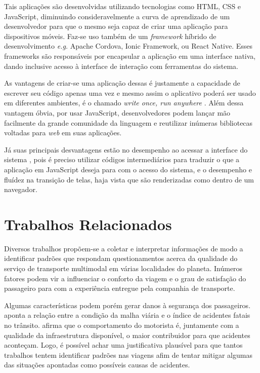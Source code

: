 \documentclass[12pt]{report} %
\begin{document}
Tais aplicações são desenvolvidas utilizando tecnologias como HTML, CSS e JavaScript, diminuindo consideravelmente a curva de aprendizado de um desenvolvedor para que o mesmo seja capaz de criar uma aplicação para dispositivos móveis. Faz-se uso também de um \textit{framework} híbrido de desenvolvimento \textit{e.g.} Apache Cordova, Ionic Framework, ou React Native. Esses frameworks são responsáveis por encapsular a aplicação em uma interface nativa, dando inclusive acesso à interface de interação com ferramentas do sistema.

As vantagens de criar-se uma aplicação dessas é justamente a capacidade de escrever seu código apenas uma vez e mesmo assim o aplicativo poderá ser usado em diferentes ambientes, é o chamado \textit{write once, run anywhere} \cite{Xanthopoulos:2013:CAC:2490257.2490292}. Além dessa vantagem óbvia, por usar JavaScript, desenvolvedores podem lançar mão facilmente da grande comunidade da linguagem e reutilizar inúmeras bibliotecas voltadas para \textit{web} em suas aplicações.

Já suas principais desvantagens estão no desempenho ao acessar a interface do sistema \cite{malavolta}, pois é preciso utilizar códigos intermediários para traduzir o que a aplicação em JavaScript deseja para com o acesso do sistema, e o desempenho e fluídez na transição de telas, haja vista que são renderizadas como dentro de um navegador.


\chapter{Trabalhos Relacionados}
\label{sec:trabalhos_relacionados}
Diversos trabalhos propõem-se a coletar e interpretar informações de modo a identificar padrões que respondam questionamentos acerca da qualidade do serviço de transporte multimodal em várias localidades do planeta. Inúmeros fatores podem vir a influenciar o conforto da viagem e o grau de satisfação do passageiro para com a experiência entregue pela companhia de transporte. 

Algumas características podem porém gerar danos à segurança dos passageiros. \citep{world2015global} aponta a relação entre a condição da malha viária e o índice de acidentes fatais no trânsito. \citep{euPolicyDep} afirma que o comportamento do motorista é, juntamente com a qualidade da infraestrutura disponível, o maior contribuidor para que acidentes aconteçam. Logo, é possível achar uma justificativa plausível para que tantos trabalhos tentem identificar padrões nas viagens afim de tentar mitigar algumas das situações apontadas como possíveis causas de acidentes.
\end{document}
